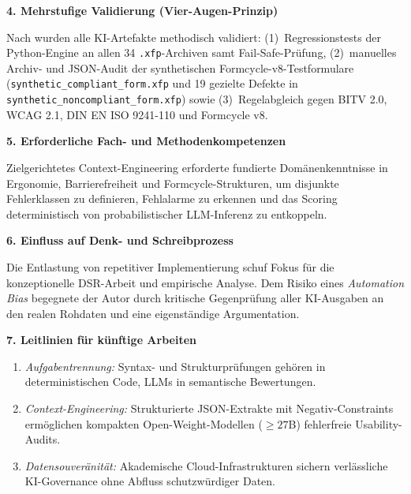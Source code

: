 \textbf{4. Mehrstufige Validierung (Vier-Augen-Prinzip)}

Nach \textcite{recker2013scientific} wurden alle KI-Artefakte methodisch validiert: (1)~Regressionstests der Python-Engine an allen 34 \texttt{.xfp}-Archiven samt Fail-Safe-Prüfung, (2)~manuelles Archiv- und JSON-Audit der synthetischen Formcycle-v8-Testformulare (\texttt{synthetic\_\allowbreak compliant\_\allowbreak form.xfp} und 19 gezielte Defekte in \texttt{synthetic\_\allowbreak noncompliant\_\allowbreak form.xfp}) sowie (3)~Regelabgleich gegen BITV 2.0, WCAG 2.1, DIN EN ISO 9241-110 und Formcycle v8.

\textbf{5. Erforderliche Fach- und Methodenkompetenzen}

Zielgerichtetes Context-Engineering erforderte fundierte Domänenkenntnisse in Ergonomie, Barrierefreiheit und Formcycle-Strukturen, um disjunkte Fehlerklassen zu definieren, Fehlalarme zu erkennen und das Scoring deterministisch von probabilistischer LLM-Inferenz zu entkoppeln.

\textbf{6. Einfluss auf Denk- und Schreibprozess}

Die Entlastung von repetitiver Implementierung schuf Fokus für die konzeptionelle DSR-Arbeit und empirische Analyse. Dem Risiko eines \textit{Automation Bias} begegnete der Autor durch kritische Gegenprüfung aller KI-Ausgaben an den realen Rohdaten und eine eigenständige Argumentation.

\textbf{7. Leitlinien für künftige Arbeiten}

\begin{enumerate}\setlength{\itemsep}{0pt}\setlength{\parskip}{0pt}
    \item \textit{Aufgabentrennung:} Syntax- und Strukturprüfungen gehören in deterministischen Code, LLMs in semantische Bewertungen.
    \item \textit{Context-Engineering:} Strukturierte JSON-Extrakte mit Negativ-Constraints ermöglichen kompakten Open-Weight-Modellen ($\ge 27$B) fehlerfreie Usability-Audits.
    \item \textit{Datensouveränität:} Akademische Cloud-Infrastrukturen sichern verlässliche KI-Governance ohne Abfluss schutzwürdiger Daten.
\end{enumerate}
